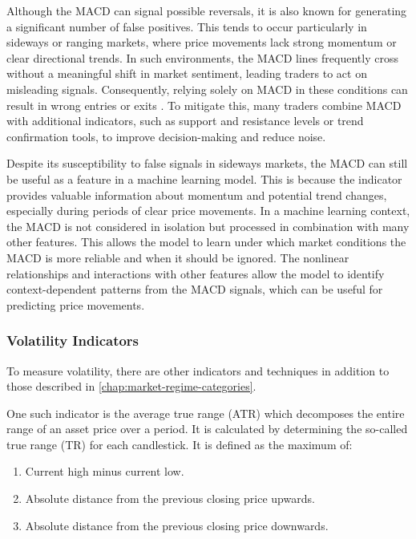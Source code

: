 Although the MACD can signal possible reversals, it is also known for generating a significant number of false positives.
This tends to occur particularly in sideways or ranging markets, where price movements lack strong momentum or clear directional trends.
In such environments, the MACD lines frequently cross without a meaningful shift in market sentiment, leading traders to act on misleading signals.
Consequently, relying solely on MACD in these conditions can result in wrong entries or exits \cite{investopia-macd}.
To mitigate this, many traders combine MACD with additional indicators, such as support and resistance levels or trend confirmation tools, to improve decision-making and reduce noise.

Despite its susceptibility to false signals in sideways markets, the MACD can still be useful as a feature in a machine learning model.
This is because the indicator provides valuable information about momentum and potential trend changes, especially during periods of clear price movements.
In a machine learning context, the MACD is not considered in isolation but processed in combination with many other features.
This allows the model to learn under which market conditions the MACD is more reliable and when it should be ignored.
The nonlinear relationships and interactions with other features allow the model to identify context-dependent patterns from the MACD signals, which can be useful for predicting price movements.


\subsubsection{Volatility Indicators}

To measure volatility, there are other indicators and techniques in addition to those described in \autoref{chap:market-regime-categories}.

One such indicator is the average true range (ATR) which decomposes the entire range of an asset price over a period.
It is calculated by determining the so-called true range (TR) for each candlestick.
It is defined as the maximum of:

\begin{enumerate}
    \item Current high minus current low.
    \item Absolute distance from the previous closing price upwards.
    \item Absolute distance from the previous closing price downwards.
\end{enumerate}

